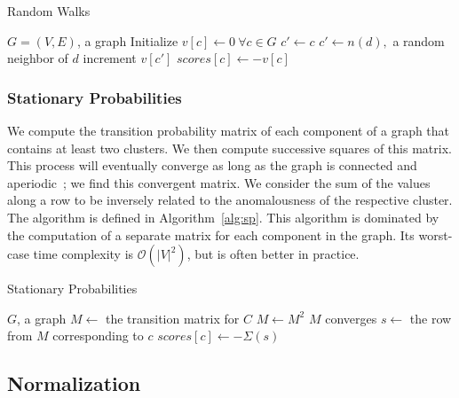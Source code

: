 \begin{algorithm}[h]
    \caption{Random Walks}
    \label{alg:rw}
\begin{algorithmic}[1]
    \REQUIRE $G = (V,E)$, a graph
    \STATE Initialize $v[c] \gets 0 \ \forall c \in G$
        \STATE $c' \gets c$
            \STATE $c' \gets n(d),$ a random neighbor of $d$
            \STATE increment $v[c']$
        \ENDFOR
    \ENDFOR
        \STATE $scores[c] \gets -v[c]$
    \ENDFOR
\end{algorithmic}
\end{algorithm}

\subsubsection{Stationary Probabilities}
We compute the transition probability matrix of each component of a graph that contains at least two clusters.
We then compute successive squares of this matrix.
This process will eventually converge as long as the graph is connected and aperiodic~\cite{levin2017markov}; we find this convergent matrix.
We consider the sum of the values along a row to be inversely related to the anomalousness of the respective cluster.
The algorithm is defined in Algorithm~\ref{alg:sp}.
This algorithm is dominated by the computation of a separate matrix for each component in the graph.
Its worst-case time complexity is $\mathcal{O}(|V|^2)$, but is often better in practice.

\begin{algorithm}[h]
    \caption{Stationary Probabilities}
    \label{alg:sp}
\begin{algorithmic}[1]
    \REQUIRE $G$, a graph
        \STATE $M \gets$ the transition matrix for $C$
        \REPEAT
            \STATE $M \gets M^2$
        \UNTIL $M$ converges
            \STATE $s \gets $ the row from $M$ corresponding to $c$
            \STATE $scores[c] \gets -\Sigma(s)$ 
        \ENDFOR
    \ENDFOR
\end{algorithmic}
\end{algorithm}


\subsection{Normalization}
\label{subsec:methods:normalization}

